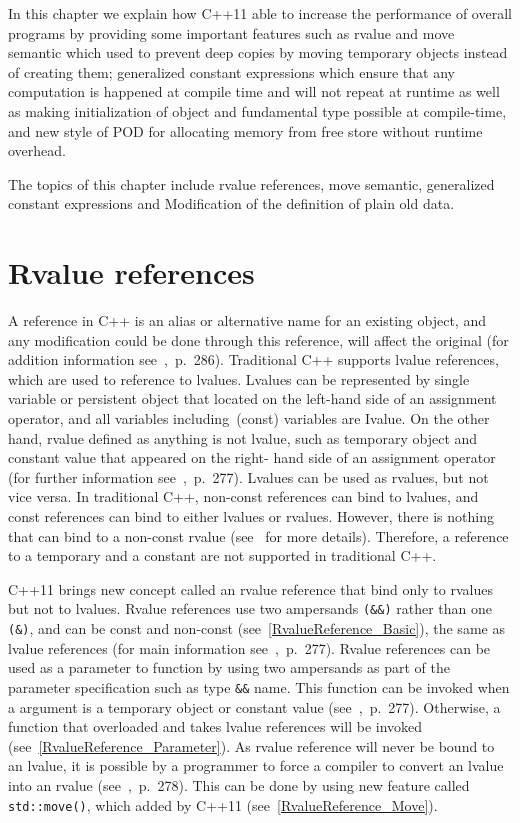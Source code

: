 \documentclass[11pt]{report}
\begin{document}
In this chapter we explain how C++11 able to increase the performance of overall programs by providing some important features such as rvalue and move semantic which used to prevent deep copies by moving temporary objects instead of creating them; generalized constant expressions which ensure that any computation is happened at compile time and will not repeat at runtime as well as making initialization of object and fundamental type possible at compile-time, and new style of POD for allocating memory from free store without runtime overhead.

The topics of this chapter include rvalue references, move semantic, generalized constant expressions and Modification of the definition of plain old data.


\section{Rvalue references}
\label{section: Rvalue references}
A reference in C++ is an alias or alternative name for an existing object, and any modification could be done through this reference, will affect the original (for addition information see~\cite{Gregorie:professionalcpp},~p.~286). Traditional C++ supports lvalue references, which are used to reference to lvalues. Lvalues can be represented by single variable or persistent object that located on the left-hand side of an assignment operator, and all variables including~(const) variables are Ivalue. On the other hand, rvalue defined as anything is not lvalue, such as temporary object and constant value that appeared on the right- hand side of an assignment operator (for further information see~\cite{Gregorie:professionalcpp},~p.~277). Lvalues can be used as rvalues, but not vice versa. In traditional C++, non-const references can bind to lvalues, and const references can bind to either lvalues or rvalues. However, there is nothing that can bind to a non-const rvalue (see~\cite{Stroustrup:2012:Cpp11} for more details). Therefore, a reference to a temporary and a constant are not supported in traditional C++.

C++11 brings new concept called an rvalue reference that bind only to rvalues but not to lvalues. Rvalue references use two ampersands \texttt{(\&\&)} rather than one \texttt{(\&)}, and can be const and non-const (see~\ref{RvalueReference_Basic}), the same as lvalue references  (for main information see~\cite{Gregorie:professionalcpp},~p.~277). Rvalue references can be used as a parameter to function by using two ampersands as part of the parameter specification such as type \texttt{\&\&} name. This function can be invoked when a argument is a temporary object or constant value (see~\cite{Gregorie:professionalcpp},~p.~277). Otherwise, a function that overloaded and takes lvalue references will be invoked (see~\ref{RvalueReference_Parameter}). As rvalue reference will never be bound to an lvalue, it is possible by a programmer to force a compiler to convert an lvalue into an rvalue (see~\cite{Gregorie:professionalcpp},~p.~278). This can be done by using new feature called \texttt{std::move()}, which added by C++11 (see~\ref{RvalueReference_Move}).
\end{document}
